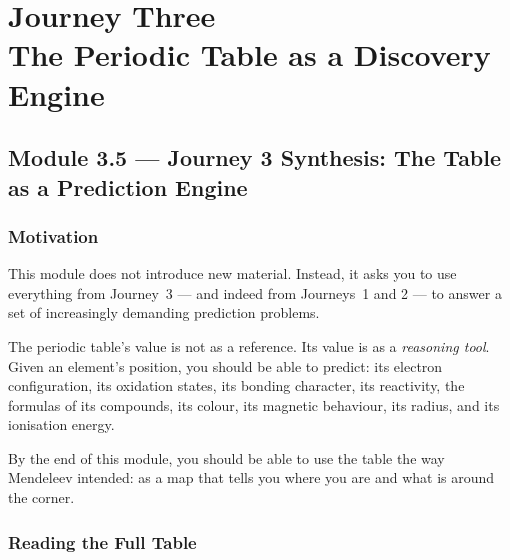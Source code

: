 \documentclass[12pt, a4paper]{book}
\begin{document}
\setcounter{chapter}{2}
\chapter[Journey 3 --- The Periodic Table as a Discovery Engine]
        {Journey Three\\[8pt]
         \textcolor{ModuleColor}{\large The Periodic Table as a Discovery Engine}}
\setcounter{section}{4}

\section{Module 3.5 --- Journey 3 Synthesis: The Table as a Prediction Engine}
\label{sec:mod3.5}

\subsection*{Motivation}

This module does not introduce new material.
Instead, it asks you to use everything from Journey~3
--- and indeed from Journeys~1 and 2 ---
to answer a set of increasingly demanding prediction problems.

The periodic table's value is not as a reference.
Its value is as a \emph{reasoning tool}.
Given an element's position, you should be able to predict:
its electron configuration, its oxidation states,
its bonding character, its reactivity, the formulas of its
compounds, its colour, its magnetic behaviour, its radius,
and its ionisation energy.

By the end of this module, you should be able to
use the table the way Mendeleev intended:
as a map that tells you where you are and what
is around the corner.

\subsection{Reading the Full Table}
\end{document}
